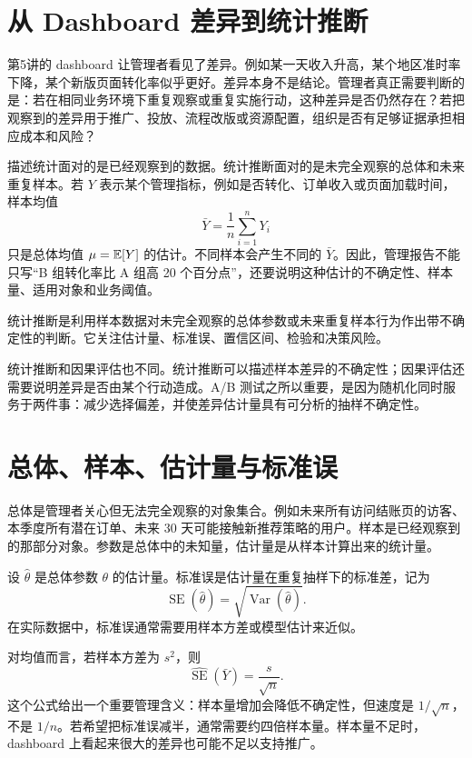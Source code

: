 \documentclass[UTF8,fontset=fandol,openany,zihao=-4]{ctexbook}
\begin{document}
\section{从 Dashboard 差异到统计推断}

第5讲的 dashboard 让管理者看见了差异。例如某一天收入升高，某个地区准时率下降，某个新版页面转化率似乎更好。差异本身不是结论。管理者真正需要判断的是：若在相同业务环境下重复观察或重复实施行动，这种差异是否仍然存在？若把观察到的差异用于推广、投放、流程改版或资源配置，组织是否有足够证据承担相应成本和风险？

描述统计面对的是已经观察到的数据。统计推断面对的是未完全观察的总体和未来重复样本。若 \(Y\) 表示某个管理指标，例如是否转化、订单收入或页面加载时间，样本均值
\[
  \bar Y=\frac{1}{n}\sum_{i=1}^n Y_i
\]
只是总体均值 \(\mu=\mathbb E[Y]\) 的估计。不同样本会产生不同的 \(\bar Y\)。因此，管理报告不能只写“B 组转化率比 A 组高 20 个百分点”，还要说明这种估计的不确定性、样本量、适用对象和业务阈值。

\begin{definition}[统计推断]
统计推断是利用样本数据对未完全观察的总体参数或未来重复样本行为作出带不确定性的判断。它关注估计量、标准误、置信区间、检验和决策风险。
\end{definition}

统计推断和因果评估也不同。统计推断可以描述样本差异的不确定性；因果评估还需要说明差异是否由某个行动造成。A/B 测试之所以重要，是因为随机化同时服务于两件事：减少选择偏差，并使差异估计量具有可分析的抽样不确定性。

\section{总体、样本、估计量与标准误}

总体是管理者关心但无法完全观察的对象集合。例如未来所有访问结账页的访客、本季度所有潜在订单、未来 30 天可能接触新推荐策略的用户。样本是已经观察到的那部分对象。参数是总体中的未知量，估计量是从样本计算出来的统计量。

\begin{definition}[标准误]
设 \(\hat\theta\) 是总体参数 \(\theta\) 的估计量。标准误是估计量在重复抽样下的标准差，记为
\[
  \operatorname{SE}(\hat\theta)=\sqrt{\operatorname{Var}(\hat\theta)}.
\]
在实际数据中，标准误通常需要用样本方差或模型估计来近似。
\end{definition}

对均值而言，若样本方差为 \(s^2\)，则
\[
  \widehat{\operatorname{SE}}(\bar Y)=\frac{s}{\sqrt n}.
\]
这个公式给出一个重要管理含义：样本量增加会降低不确定性，但速度是 \(1/\sqrt n\)，不是 \(1/n\)。若希望把标准误减半，通常需要约四倍样本量。样本量不足时，dashboard 上看起来很大的差异也可能不足以支持推广。
\end{document}
